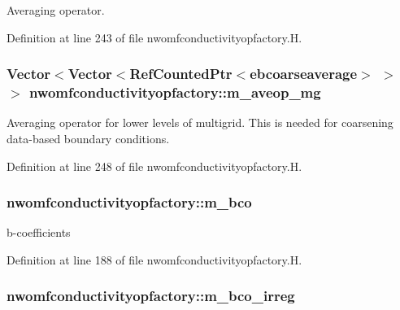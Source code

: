 Averaging operator. 



Definition at line 243 of file nwomfconductivityopfactory.\+H.

\subsubsection[{\texorpdfstring{m\+\_\+aveop\+\_\+mg}{m_aveop_mg}}]{\setlength{\rightskip}{0pt plus 5cm}Vector$<$Vector$<$Ref\+Counted\+Ptr$<${\bf ebcoarseaverage}$>$ $>$ $>$ nwomfconductivityopfactory\+::m\+\_\+aveop\+\_\+mg\hspace{0.3cm}{\ttfamily [protected]}}\hypertarget{classnwomfconductivityopfactory_a9f453f54d74ecd1eea960d338b6aaa07}{}\label{classnwomfconductivityopfactory_a9f453f54d74ecd1eea960d338b6aaa07}


Averaging operator for lower levels of multigrid. This is needed for coarsening data-\/based boundary conditions. 



Definition at line 248 of file nwomfconductivityopfactory.\+H.

\subsubsection[{\texorpdfstring{m\+\_\+bco}{m_bco}}]{ nwomfconductivityopfactory\+::m\+\_\+bco\hspace{0.3cm}{\ttfamily [protected]}}\hypertarget{classnwomfconductivityopfactory_a7db2a52626f9d6ee0ac3763decbbfc15}{}\label{classnwomfconductivityopfactory_a7db2a52626f9d6ee0ac3763decbbfc15}


b-\/coefficients 



Definition at line 188 of file nwomfconductivityopfactory.\+H.

\subsubsection[{\texorpdfstring{m\+\_\+bco\+\_\+irreg}{m_bco_irreg}}]{ nwomfconductivityopfactory\+::m\+\_\+bco\+\_\+irreg\hspace{0.3cm}{\ttfamily [protected]}}\hypertarget{classnwomfconductivityopfactory_a052d67e45ad98de7c8e39d5ddad7fbd2}{}\label{classnwomfconductivityopfactory_a052d67e45ad98de7c8e39d5ddad7fbd2}


